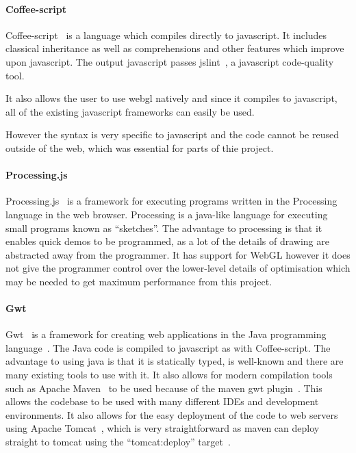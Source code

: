 \paragraph{Coffee-script}
Coffee-script~\cite{web:coffeescript} is a language which compiles directly to javascript.
It includes classical inheritance as well as comprehensions and other features which improve upon javascript.
The output javascript passes jslint~\cite{web:jslint}, a javascript code-quality tool.

It also allows the user to use webgl natively and since it compiles to javascript, all of the existing javascript frameworks can easily be used.

However the syntax is very specific to javascript and the code cannot be reused outside of the web, which was essential for parts of thie project.

\paragraph{Processing.js}
Processing.js~\cite{web:processingjs} is a framework for executing programs written in the Processing~\cite{web:processing} language in the web browser.
Processing is a java-like language for executing small programs known as ``sketches''.
The advantage to processing is that it enables quick demos to be programmed, as a lot of the details of drawing are abstracted away from the programmer.
It has support for WebGL however it does not give the programmer control over the lower-level details of optimisation which may be needed to get maximum performance from this project.

\paragraph{Gwt}
Gwt~\cite{web:gwt} is a framework for creating web applications in the Java programming language~\cite{web:java}.
The Java code is compiled to javascript as with Coffee-script.
The advantage to using java is that it is statically typed, is well-known and there are many existing tools to use with it.
It also allows for modern compilation tools such as Apache Maven~\cite{web:maven} to be used because of the maven gwt plugin~\cite{web:mvngwtplugin}.
This allows the codebase to be used with many different IDEs and development environments.
It also allows for the easy deployment of the code to web servers using Apache Tomcat~\cite{web:tomcat}, which is very straightforward as maven can deploy straight to tomcat using the ``tomcat:deploy'' target~\cite{web:mvntomcatplugin}.

